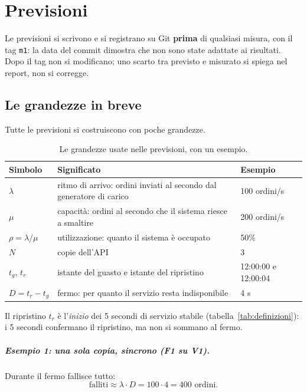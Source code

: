 \chapter{Previsioni}
\label{cap:previsioni}

Le previsioni si scrivono e si registrano su Git \textbf{prima} di qualsiasi misura, con il tag \texttt{m1}: la data del commit dimostra che non sono state adattate ai risultati. Dopo il tag non si modificano; uno scarto tra previsto e misurato si spiega nel report, non si corregge.

\section{Le grandezze in breve}
\label{sec:grandezze}

Tutte le previsioni si costruiscono con poche grandezze.

\begin{table}[htbp]
\centering
\caption{Le grandezze usate nelle previsioni, con un esempio.}
\label{tab:grandezze}
\begin{tabularx}{\linewidth}{@{}lLl@{}}
\toprule
\textbf{Simbolo} & \textbf{Significato} & \textbf{Esempio} \\
\midrule
$\lambda$ & ritmo di arrivo: ordini inviati al secondo dal generatore di carico & 100 ordini/s \\
$\mu$ & capacità: ordini al secondo che il sistema riesce a smaltire & 200 ordini/s \\
$\rho = \lambda / \mu$ & utilizzazione: quanto il sistema è occupato & 50\% \\
$N$ & copie dell'API & 3 \\
$t_g$, $t_r$ & istante del guasto e istante del ripristino & 12:00:00 e 12:00:04 \\
$D = t_r - t_g$ & fermo: per quanto il servizio resta indisponibile & 4 s \\
\bottomrule
\end{tabularx}
\end{table}

Il ripristino $t_r$ è l'\emph{inizio} dei 5 secondi di servizio stabile (tabella~\ref{tab:definizioni}): i 5 secondi confermano il ripristino, ma non si sommano al fermo.

\paragraph{Esempio 1: una sola copia, sincrono (F1 su V1).} Durante il fermo fallisce tutto:
\[
\text{falliti} \approx \lambda \cdot D = 100 \cdot 4 = 400 \text{ ordini.}
\]

